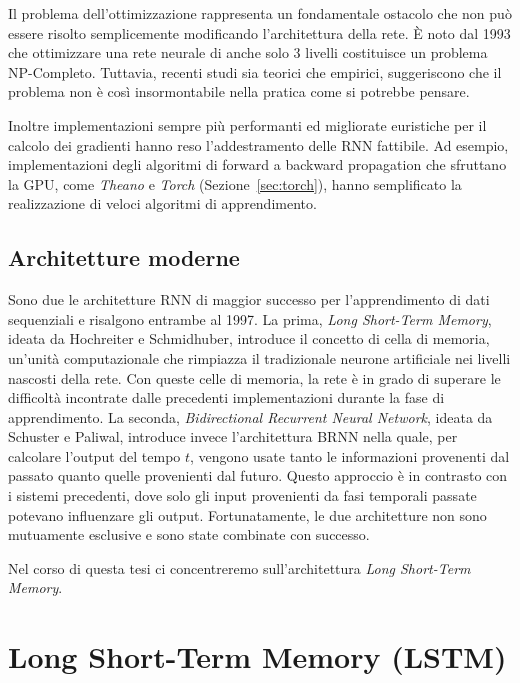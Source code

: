 Il problema dell'ottimizzazione rappresenta un fondamentale ostacolo che non pu\`o
essere risolto semplicemente modificando l'architettura della rete. \`E noto dal
1993 che ottimizzare una rete neurale di anche solo 3 livelli costituisce un
problema NP-Completo. Tuttavia, recenti studi sia teorici che empirici, suggeriscono
che il problema non \`e cos\`i insormontabile nella pratica come si potrebbe pensare.

Inoltre implementazioni sempre pi\`u performanti ed migliorate euristiche per il
calcolo dei gradienti hanno reso l'addestramento delle RNN fattibile. Ad esempio,
implementazioni degli algoritmi di forward a backward propagation che sfruttano
la GPU, come \emph{Theano} e \emph{Torch} (Sezione~\ref{sec:torch}), hanno
semplificato la realizzazione di veloci algoritmi di apprendimento.

\subsection{Architetture moderne}

Sono due le architetture RNN di maggior successo per l'apprendimento di dati
sequenziali e risalgono entrambe al 1997. La prima, \emph{Long Short-Term Memory},
ideata da Hochreiter e Schmidhuber, introduce il concetto di cella di memoria,
un'unit\`a computazionale che rimpiazza il tradizionale neurone artificiale nei
livelli nascosti della rete. Con queste celle di memoria, la rete \`e in grado
di superare le difficolt\`a incontrate dalle precedenti implementazioni durante
la fase di apprendimento. La seconda, \emph{Bidirectional Recurrent Neural Network},
ideata da Schuster e Paliwal, introduce invece l'architettura BRNN nella quale,
per calcolare l'output del tempo $t$, vengono usate tanto le informazioni provenenti
dal passato quanto quelle provenienti dal futuro. Questo approccio \`e in contrasto
con i sistemi precedenti, dove solo gli input provenienti da fasi temporali passate
potevano influenzare gli output. Fortunatamente, le due architetture non sono
mutuamente esclusive e sono state combinate con successo.

Nel corso di questa tesi ci concentreremo sull'architettura \emph{Long Short-Term
Memory}.

\section{Long Short-Term Memory (LSTM)}

